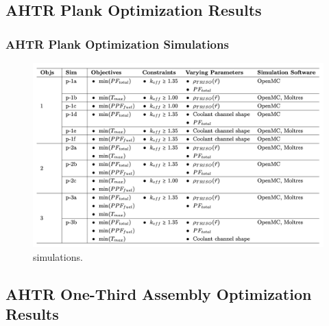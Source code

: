 \subsection{AHTR Plank Optimization Results}
\frametitle{AHTR Plank Optimization Simulations}
\begin{frame}
\begin{figure}
    \includegraphics[width=0.95\linewidth]{figures/ahtr-plank-opt-table.png} 
    \caption{simulations.}
\end{figure}
\end{frame}

\subsection{AHTR One-Third Assembly Optimization Results}